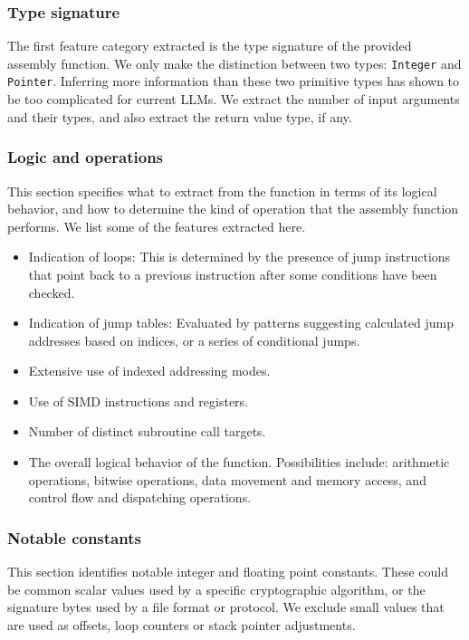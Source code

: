 \subsubsection{Type signature}

The first feature category extracted is the type signature of the provided assembly function.
We only make the distinction between two types: \texttt{Integer} and \texttt{Pointer}. Inferring more information than these two 
primitive types has shown to be too complicated for current LLMs. We extract the number of input arguments
and their types, and also extract the return value type, if any.

\subsubsection{Logic and operations}

This section specifies what to extract from the function in terms of its logical behavior, and how to determine the kind of
operation that the assembly function performs. We list some of the features extracted here.

\begin{itemize}
\item Indication of loops: This is determined by the presence of jump instructions that point back to a previous
instruction after some conditions have been checked.
\item Indication of jump tables: Evaluated by patterns suggesting calculated jump addresses based on
indices, or a series of conditional jumps.
\item Extensive use of indexed addressing modes.
\item Use of SIMD instructions and registers.
\item Number of distinct subroutine call targets.
\item The overall logical behavior of the function. Possibilities include: arithmetic operations, bitwise operations, data movement and memory access,
and control flow and dispatching operations.
\end{itemize}

\subsubsection{Notable constants}

This section identifies notable integer and floating point constants.  These could be common scalar values used by
a specific cryptographic algorithm, or the signature bytes used by a file format or protocol. We exclude small
values that are used as offsets, loop counters or stack pointer adjustments.

